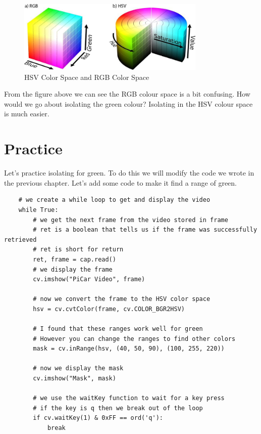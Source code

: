\documentclass[11pt]{report}
\begin{document}
\begin{figure}[htbp]
    \centering
    \includegraphics[width=0.8\textwidth]{HSVVSRGB.jpeg}
    \caption{HSV Color Space and RGB Color Space}
    \label{fig:HSVVSRGB}
\end{figure}

From the figure above we can see the RGB colour space is a bit confusing. How would we go about isolating the green colour? 
Isolating in the HSV colour space is much easier.

\section{Practice}
Let's practice isolating for green. To do this we will modify the code we wrote in the previous chapter. Let's add some code to make it find a range of green.

\begin{verbatim}
    # we create a while loop to get and display the video
    while True:
        # we get the next frame from the video stored in frame
        # ret is a boolean that tells us if the frame was successfully retrieved
        # ret is short for return
        ret, frame = cap.read()
        # we display the frame
        cv.imshow("PiCar Video", frame)

        # now we convert the frame to the HSV color space
        hsv = cv.cvtColor(frame, cv.COLOR_BGR2HSV)

        # I found that these ranges work well for green
        # However you can change the ranges to find other colors
        mask = cv.inRange(hsv, (40, 50, 90), (100, 255, 220))

        # now we display the mask
        cv.imshow("Mask", mask)

        # we use the waitKey function to wait for a key press
        # if the key is q then we break out of the loop
        if cv.waitKey(1) & 0xFF == ord('q'):
            break

\end{verbatim}
\end{document}
